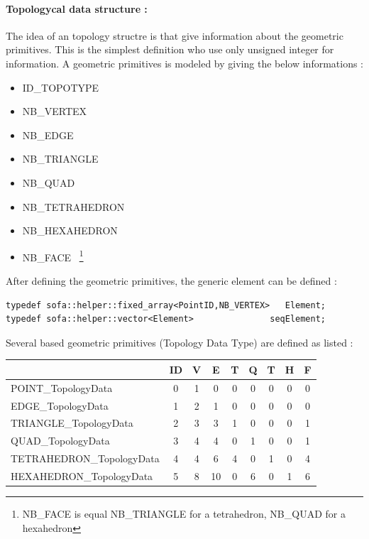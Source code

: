 \documentclass[a4paper,10pt]{article}
\begin{document}
\paragraph{Topologycal data structure : }
The idea of an topology structre is that give information about the geometric primitives. This is the simplest definition who use only unsigned integer for information. A geometric primitives is modeled by giving the below informations : 
\begin{itemize}
 \item ID\_TOPOTYPE
 \item NB\_VERTEX
 \item NB\_EDGE
 \item NB\_TRIANGLE
 \item NB\_QUAD
 \item NB\_TETRAHEDRON 
 \item NB\_HEXAHEDRON
 \item NB\_FACE ~\footnote{ NB\_FACE is equal NB\_TRIANGLE for a tetrahedron, NB\_QUAD for a hexahedron}
\end{itemize}
After defining the geometric primitives, the generic element can be defined : 
\begin{lstlisting}
typedef sofa::helper::fixed_array<PointID,NB_VERTEX>   Element;
typedef sofa::helper::vector<Element>               seqElement;
\end{lstlisting} 
Several based geometric primitives (Topology Data Type) are defined as listed :
\begin{center}
  \begin{tabular}{|l|c|c|c|c|c|c|c|c|}
    \hline
                              &ID &V&E&T&Q&T&H&F \\
    \hline
    POINT\_TopologyData       & 0 &1&0&0&0&0&0&0 \\
    \hline
    EDGE\_TopologyData        & 1 &2&1&0&0&0&0&0 \\
    \hline
    TRIANGLE\_TopologyData    & 2 &3&3&1&0&0&0&1 \\
    \hline
    QUAD\_TopologyData        & 3 &4&4&0&1&0&0&1 \\
    \hline
    TETRAHEDRON\_TopologyData & 4 &4&6&4&0&1&0&4 \\
    \hline
    HEXAHEDRON\_TopologyData  & 5 &8&10&0&6&0&1&6 \\
    \hline
  \end{tabular}
\end{center}
\end{document}
